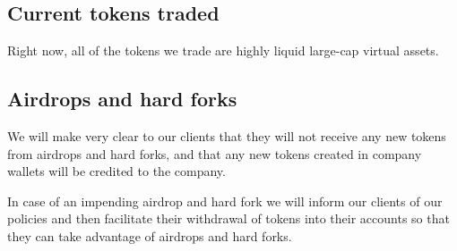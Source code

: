 \subsection{Current tokens traded}
Right now, all of the tokens we trade are highly liquid large-cap
virtual assets.

\subsection{Airdrops and hard forks}
We will make very clear to our clients that they will not receive any
new tokens from airdrops and hard forks, and that any new tokens
created in company wallets will be credited to the company.

In case of an impending airdrop and hard fork we will inform our
clients of our policies and then facilitate their withdrawal of tokens
into their accounts so that they can take advantage of airdrops and
hard forks.



